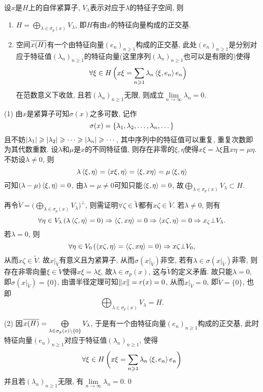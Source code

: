 	\begin{Theorem}[自伴紧算子的谱分解]\label{thm:自伴紧算子的谱分解}
	设$ x $是$ H $上的自伴紧算子, $ V_\lambda $表示对应于$ \lambda $的特征子空间, 则
	\begin{enumerate}[(1)]
	\item $ H=\bigoplus\limits_{\lambda\in\sigma_p(x)}V_\lambda $, 即$ H $有由$ x $的特征向量构成的正交基.
	\item 空间$ \baro{x(H)} $有一个由特征向量$ (e_n)_{n\geqslant 1} $构成的正交基, 此处$ (e_n)_{n\geqslant 1} $是分别对应于特征值$ (\lambda_n)_{n\geqslant 1} $的特征向量(这里序列$ (\lambda_n)_{n\geqslant 1} $也可以是有限的)使得
	\[
	\forall \xi\in H\,\Big(x\xi=\sum_{n\geqslant 1}\lambda_n\lrangle{\xi,e_n}e_n\Big)
	\]
	在范数意义下收敛, 且若$ (\lambda_n)_{n\geqslant 1} $无限, 则成立$ \lim\limits_{n\to\infty}\lambda_n=0 $.
	\end{enumerate}
	\end{Theorem}
	\begin{Proof}
	(1) 由$ x $是紧算子可知$ \sigma(x) $之多可数, 记作
	\[
	\sigma(x)=\{ \seq{\lambda},\dots \}
	\]
	且不妨$ \abs{\lambda_1}\geqslant\abs{\lambda_2}\geqslant\cdots\geqslant\abs{\lambda_n}\geqslant\cdots $, 其中序列中的特征值可以重复, 重复次数即为其代数重数. 设$ \lambda $和$ \mu $是$ x $的不同特征值, 则存在非零的$ \xi,\eta $使得$ x\xi=\lambda \xi $且$ x\eta=\mu \eta $. 不妨设$ \lambda\ne 0 $, 则
	\[
	\lambda\lrangle{\xi,\eta}=\lrangle{x\xi,\eta}=\lrangle{\xi,x\eta}=\mu\lrangle{\xi,\eta}
	\]
	可知$ (\lambda-\mu)\lrangle{\xi,\eta}=0 $, 由$ \lambda=\mu\ne0 $可知只能$ \lrangle{\xi,\eta}=0 $, 故$ \bigoplus\limits_{\lambda\in\sigma_p(x)}V_\lambda\subset H $.
	
	再令$ \tilde{V}=\Big(\bigoplus\limits_{\lambda\in\sigma_p(x)}V_\lambda\Big)^\bot $, 则需证明$ \forall \zeta\in\tilde{V} $都有$ x\zeta\in\tilde{V} $. 若$ \lambda\ne 0 $, 则有
	\[
	\forall \eta\in V_\lambda\,(\lambda\lrangle{\zeta,\eta}=0)\Rightarrow\lrangle{\zeta,x\eta}=0\Rightarrow\lrangle{x\zeta,\eta}=0\Rightarrow x_\zeta\bot V_\lambda.
	\]
	若$ \lambda=0 $, 则
	\[
	\forall \eta\in V_0\,(\lrangle{x\zeta,\eta}=\lrangle{\zeta,x\eta}=0)\Rightarrow x\zeta\bot V_0,
	\]
	从而$ x\zeta\in\tilde{V} $. 故$ x|_{\tilde V} $有意义且为紧算子, 从而$ \sigma(x|_{\tilde V}) $非空, 若有$ \lambda\in\sigma(x|_{\tilde V}) $非零, 则存在非零向量$ \xi\in\tilde{V} $使得$ x\xi=\lambda \xi $, 故$ \lambda\in\sigma_p(x) $, 这与$ \tilde{V} $的定义矛盾. 故只能$ \lambda=0 $, 即$ \sigma(x|_{\tilde{V}})=\{0\} $, 由谱半径定理可知$ \norm{x}=r(x)=0 $, 从而$ x|_{\tilde V}=0 $, 即$ \tilde{V}=\{0\} $, 也即
	\[
	\bigoplus_{\lambda\in\sigma_p(x)}V_\lambda=H.
	\]
	
	(2) 因$ \baro{x(H)}=\bigoplus\limits_{\lambda\in\sigma_p(x)\sm\{0\}}V_\lambda $, 于是有一个由特征向量$ (e_n)_{n\geqslant 1} $构成的正交基, 此时特征向量$ (e_n)_{n\geqslant 1} $对应于特征值$ (\lambda_n)_{n\geqslant 1} $, 使得
	\[
	\forall \xi\in H\,\bigg(x\xi=\sum_{n\geqslant 1}\lambda_n\lrangle{\xi,e_n}e_n\bigg)
	\]
	并且若$ (\lambda_n)_{n\geqslant 1} $无限, 有$ \lim\limits_{n\to\infty}\lambda_n=0 $.\qed
	\end{Proof}

